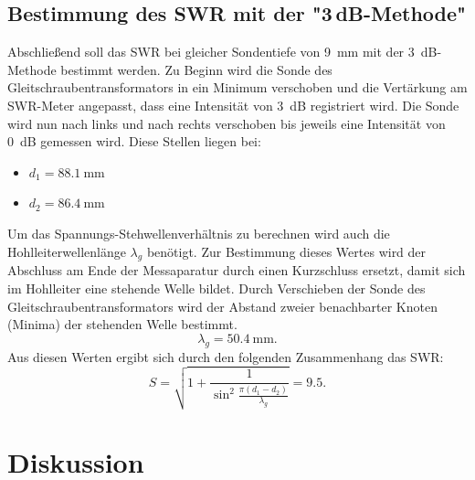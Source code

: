 \documentclass[a4paper]{article}
\begin{document}
\subsection{Bestimmung des SWR mit der "3\,dB-Methode"}
Abschließend soll das SWR bei gleicher Sondentiefe von \SI{9}{\milli\meter} mit der \SI{3}{\dB}-Methode bestimmt werden.
Zu Beginn wird die Sonde des Gleitschraubentransformators in ein Minimum verschoben und die Vertärkung am SWR-Meter angepasst, dass eine Intensität von
\SI{3}{\dB} registriert wird. 
Die Sonde wird nun nach links und nach rechts verschoben bis jeweils eine Intensität von \SI{0}{\dB} gemessen wird.
Diese Stellen liegen bei:
\begin{itemize}
\item $d_1 = \SI{88,1}{\milli\meter}$
\item $d_2 = \SI{86,4}{\milli\meter}$
\end{itemize}
Um das Spannungs-Stehwellenverhältnis zu berechnen wird auch die Hohlleiterwellenlänge $\lambda_g$ benötigt. 
Zur Bestimmung dieses Wertes wird der Abschluss am Ende der Messaparatur durch einen Kurzschluss ersetzt, damit sich im Hohlleiter eine stehende Welle
bildet.
Durch Verschieben der Sonde des Gleitschraubentransformators wird der Abstand zweier benachbarter Knoten (Minima) der stehenden Welle bestimmt.
\[
\lambda_g = \SI{50,4}{\milli\meter}.
\]
Aus diesen Werten ergibt sich durch den folgenden Zusammenhang das SWR:
\[
S = \sqrt{1 + \frac1{\sin^2 \frac{\pi \left( d_1-d_2\right)}{\lambda_g}}} = \num{9,5}.
\]


\section{Diskussion}
\end{document}

